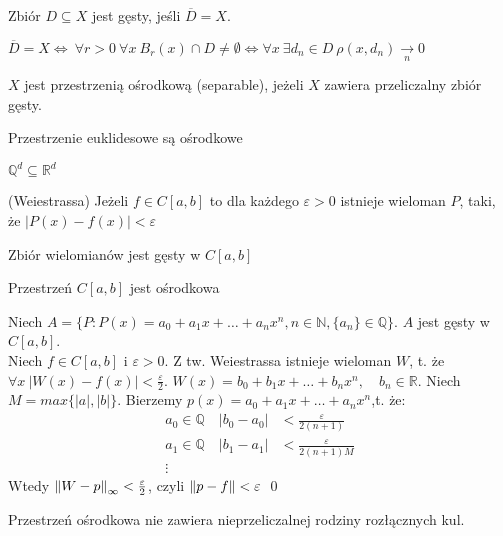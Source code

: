 \begin{df} Zbiór $D \subseteq X$ jest gęsty, jeśli $\overline{D} = X$. \end{df}
\begin{uw} $\overline{D} = X \Leftrightarrow \ \forall r > 0 \ \forall x \ B_r(x) \cap D \neq \emptyset \Leftrightarrow \forall x \ \exists d_n \in D \ \rho(x,d_n) \underset{n}{\rightarrow} 0$ \end{uw}
\begin{df} $X$ jest przestrzenią ośrodkową (separable), jeżeli $X$ zawiera przeliczalny zbiór gęsty.\end{df}  
\begin{tw} Przestrzenie euklidesowe są ośrodkowe \end{tw} 
\begin{dd} $\mathbb{Q}^d \subseteq \mathbb{R}^d $ \end{dd} 
\begin{tw}(Weiestrassa) Jeżeli $f \in C[a,b]$ to dla każdego $\varepsilon > 0$ istnieje wieloman $P$, taki, że $|P(x)-f(x)| < \varepsilon$ \end{tw}
\begin{wn} Zbiór wielomianów jest gęsty w $C[a,b]$ \end{wn} 
\begin{wn} Przestrzeń $C[a,b]$ jest ośrodkowa \end{wn}
\begin{dd} 
    Niech $A = \{P : P(x) = a_0 + a_1 x + \ldots + a_n x^n, n \in \mathbb{N} , \{a_n\} \in \mathbb{Q} \}$. $A$ jest gęsty w $C[a,b]$. \\ 
    Niech $f \in C[a,b]$ i $ \varepsilon > 0$. Z tw. Weiestrassa istnieje wieloman $W$, t. że $\forall x \ |W(x) - f(x)| < \frac{\varepsilon}{2}$.
    $W(x) = b_0 + b_1 x + \ldots + b_n x^n, \quad b_n \in \mathbb{R}$. Niech $M = max\{|a|,|b|\}$. Bierzemy $p(x) = a_0 + a_1 x + \ldots + a_n x^n$,t. że: 
    \begin{align*}
        a_0 \in \mathbb{Q} \quad |b_0 - a_0| &< \frac{\varepsilon}{2(n+1)}\\ 
        a_1 \in \mathbb{Q} \quad |b_1 - a_1| &< \frac{\varepsilon}{2(n+1)M} \\ 
        \vdots
    \end{align*}
    Wtedy $\left\lVert W-p\right\rVert_\infty < \frac{\varepsilon}{2}$, czyli $\left\lVert p-f\right\rVert < \varepsilon$ \hfill \qed  
\end{dd} 
\begin{uw} Przestrzeń ośrodkowa nie zawiera nieprzeliczalnej rodziny rozłącznych kul. \end{uw} 

